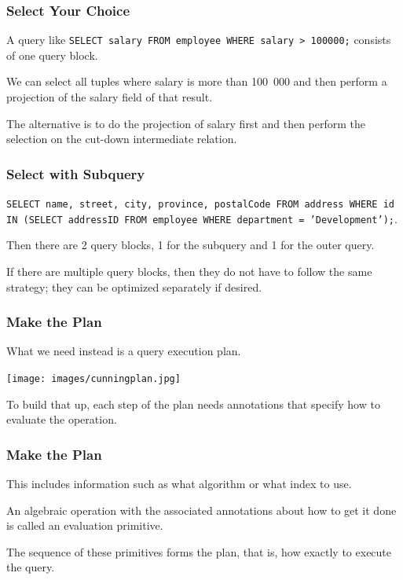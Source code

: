 \begin{frame}
\frametitle{Select Your Choice}
A query like \texttt{SELECT salary FROM employee WHERE salary > 100000;} consists of one query block. 

We can select all tuples where salary is more than 100~000 and then perform a projection of the salary field of that result. 

The alternative is to do the projection of salary first and then perform the selection on the cut-down intermediate relation.

\end{frame}


\begin{frame}
\frametitle{Select with Subquery}

\texttt{SELECT name, street, city, province, postalCode FROM address WHERE id IN (SELECT addressID FROM employee WHERE department = 'Development');}. 

Then there are 2 query blocks, 1 for the subquery and 1 for the outer query. 

If there are multiple query blocks, then they do not have to follow the same strategy; they can be optimized separately if desired. 

\end{frame}


\begin{frame}
\frametitle{Make the Plan}


What we need instead is a \alert{query execution plan}.

\begin{center}
	\texttt{[image: images/cunningplan.jpg]}
\end{center}


To build that up, each step of the plan needs annotations that specify how to evaluate the operation. 
\end{frame}


\begin{frame}
\frametitle{Make the Plan}



This includes information such as what algorithm or what index to use. 

An algebraic operation with the associated annotations about how to get it done is called an \alert{evaluation primitive}. 

The sequence of these primitives forms the plan, that is, how exactly to execute the query.

\end{frame}

